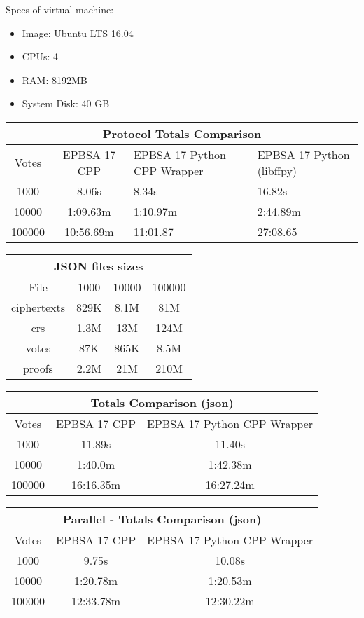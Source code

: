 \documentclass{article}
\begin{document}
Specs of virtual machine:

\begin{itemize}
\item Image: Ubuntu LTS 16.04
\item CPUs: 4
\item RAM: 8192MB
\item System Disk: 40 GB
\end{itemize}


\begin{tabular}{ |c|c|p{3cm}|p{3cm}| }
    \hline
    \multicolumn{4}{|c|}{Protocol Totals Comparison} \\
    \hline
    Votes & EPBSA 17 CPP & EPBSA 17 Python CPP Wrapper & EPBSA 17 Python (libffpy) \\
    \hline
    1000 & 8.06s & 8.34s & 16.82s \\
    10000 & 1:09.63m & 1:10.97m & 2:44.89m \\
    100000 & 10:56.69m & 11:01.87 & 27:08.65 \\
    \hline
\end{tabular}
\newline
\vspace*{1 cm}
\newline
\begin{tabular}{ |c|c|c|c| }
    \hline
    \multicolumn{4}{|c|}{JSON files sizes} \\
    \hline
    File & 1000 & 10000 & 100000 \\
    \hline
    ciphertexts & 829K & 8.1M & 81M \\
    crs & 1.3M & 13M & 124M \\
    votes & 87K & 865K & 8.5M \\
    proofs & 2.2M & 21M & 210M \\
    \hline
\end{tabular}
\newline
\vspace*{1 cm}
\newline
\begin{tabular}{ |c|c|c| }
    \hline
    \multicolumn{3}{|c|}{Totals Comparison (json)} \\
    \hline
    Votes & EPBSA 17 CPP & EPBSA 17 Python CPP Wrapper\\
    \hline
    1000 & 11.89s & 11.40s \\
    10000 & 1:40.0m & 1:42.38m \\
    100000 & 16:16.35m & 16:27.24m \\
    \hline
\end{tabular}
\newline
\vspace*{1 cm}
\newline
\begin{tabular}{ |c|c|c| }
    \hline
    \multicolumn{3}{|c|}{Parallel - Totals Comparison (json)} \\
    \hline
    Votes & EPBSA 17 CPP & EPBSA 17 Python CPP Wrapper\\
    \hline
    1000 & 9.75s & 10.08s \\
    10000 & 1:20.78m & 1:20.53m \\
    100000 & 12:33.78m & 12:30.22m \\
    \hline
\end{tabular}
\end{document}
